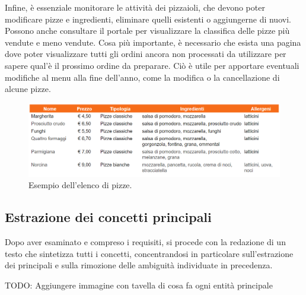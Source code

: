 \documentclass[a4paper,12pt, oneside]{article}
\begin{document}
Infine, è essenziale monitorare le attività dei pizzaioli, che devono
poter modificare pizze e ingredienti, eliminare quelli esistenti o
aggiungerne di nuovi. Possono anche consultare il portale per
visualizzare la classifica delle pizze più vendute e meno vendute.
Cosa più importante, è necessario che esista una pagina dove poter
visualizzare tutti gli ordini ancora non processati da utilizzare 
per sapere qual'è il prossimo ordine da preparare.
Ciò è utile per apportare eventuali modifiche al menu alla fine
dell'anno, come la modifica o la cancellazione di alcune pizze.

\newpage
\begin{figure}[h]
    \centering
    \includegraphics[width=1\textwidth]{esempio_pizze.png}
    \caption{Esempio dell'elenco di pizze.}
    \label{fig:esempio_pizze}
\end{figure}

\subsection{Estrazione dei concetti principali}

Dopo aver esaminato e compreso i requisiti, si procede con la redazione
di un testo che sintetizza tutti i concetti, concentrandosi in
particolare sull'estrazione dei principali e sulla rimozione delle
ambiguità individuate in precedenza.

TODO: Aggiungere immagine con tavella di cosa fa ogni entità principale
\end{document}
